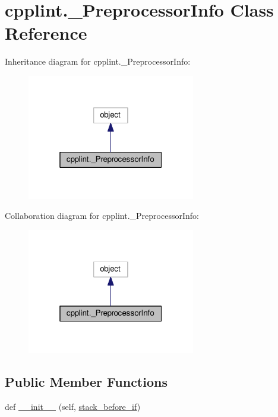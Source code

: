 \hypertarget{classcpplint_1_1___preprocessor_info}{}\section{cpplint.\+\_\+\+Preprocessor\+Info Class Reference}
\label{classcpplint_1_1___preprocessor_info}


Inheritance diagram for cpplint.\+\_\+\+Preprocessor\+Info\+:
\nopagebreak
\begin{figure}[H]
\begin{center}
\leavevmode
\includegraphics[width=208pt]{classcpplint_1_1___preprocessor_info__inherit__graph}
\end{center}
\end{figure}


Collaboration diagram for cpplint.\+\_\+\+Preprocessor\+Info\+:
\nopagebreak
\begin{figure}[H]
\begin{center}
\leavevmode
\includegraphics[width=208pt]{classcpplint_1_1___preprocessor_info__coll__graph}
\end{center}
\end{figure}
\subsection*{Public Member Functions}
\begin{DoxyCompactItemize}
\item 
def \hyperlink{classcpplint_1_1___preprocessor_info_a1394d17434a22d32b0ea9d6424e5c47b}{\+\_\+\+\_\+init\+\_\+\+\_\+} (self, \hyperlink{classcpplint_1_1___preprocessor_info_a0681b2adca3171a495fc1eca43d245c0}{stack\+\_\+before\+\_\+if})
\end{DoxyCompactItemize}
